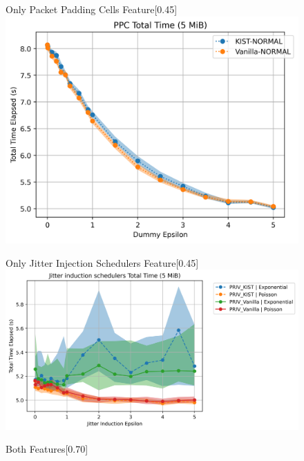 \begin{figure}[htbp]
    \centering
    \begin{subcaptionbox}{Only Packet Padding Cells Feature\label{fig:local_ppc_total_time}}[0.45\textwidth]
        {\includegraphics[width=\linewidth]{Chapters/Figures/Plots/local_total_time_50_PPC_5mib.png}}
    \end{subcaptionbox}
    \hfill
    \begin{subcaptionbox}{Only Jitter Injection Schedulers Feature\label{fig:local_jitter_total_time}}[0.45\textwidth]
        {\includegraphics[width=\linewidth]{Chapters/Figures/Plots/local_total_time_50_jitter_5mib.png}}
    \end{subcaptionbox}
    \vfill
    \begin{subcaptionbox}{Both Features\label{fig:local_both_total_time}}[0.70\textwidth]

\end{subcaptionbox}
\end{figure}
